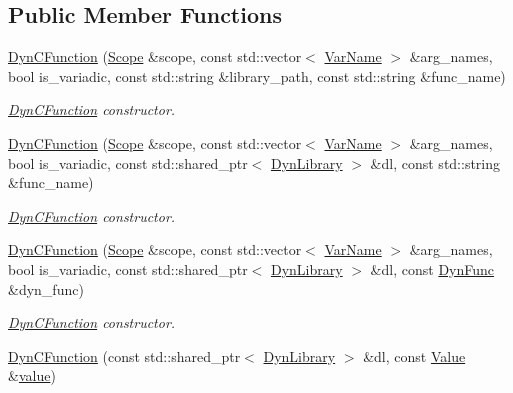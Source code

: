 \subsection*{Public Member Functions}
\begin{DoxyCompactItemize}
\item 
\hyperlink{classcreek_1_1_dyn_c_function_aaeac7125ecea826e83e2c2e2475e7efe}{Dyn\+C\+Function} (\hyperlink{classcreek_1_1_scope}{Scope} \&scope, const std\+::vector$<$ \hyperlink{classcreek_1_1_var_name}{Var\+Name} $>$ \&arg\+\_\+names, bool is\+\_\+variadic, const std\+::string \&library\+\_\+path, const std\+::string \&func\+\_\+name)
\begin{DoxyCompactList}\small\item\em {\ttfamily \hyperlink{classcreek_1_1_dyn_c_function}{Dyn\+C\+Function}} constructor. \end{DoxyCompactList}\item 
\hyperlink{classcreek_1_1_dyn_c_function_aeb45e8760de9ceb5124646fb7fab026a}{Dyn\+C\+Function} (\hyperlink{classcreek_1_1_scope}{Scope} \&scope, const std\+::vector$<$ \hyperlink{classcreek_1_1_var_name}{Var\+Name} $>$ \&arg\+\_\+names, bool is\+\_\+variadic, const std\+::shared\+\_\+ptr$<$ \hyperlink{classcreek_1_1_dyn_library}{Dyn\+Library} $>$ \&dl, const std\+::string \&func\+\_\+name)
\begin{DoxyCompactList}\small\item\em {\ttfamily \hyperlink{classcreek_1_1_dyn_c_function}{Dyn\+C\+Function}} constructor. \end{DoxyCompactList}\item 
\hyperlink{classcreek_1_1_dyn_c_function_a34582ebf2aeaa44446721f5aaee89cca}{Dyn\+C\+Function} (\hyperlink{classcreek_1_1_scope}{Scope} \&scope, const std\+::vector$<$ \hyperlink{classcreek_1_1_var_name}{Var\+Name} $>$ \&arg\+\_\+names, bool is\+\_\+variadic, const std\+::shared\+\_\+ptr$<$ \hyperlink{classcreek_1_1_dyn_library}{Dyn\+Library} $>$ \&dl, const \hyperlink{classcreek_1_1_dyn_func}{Dyn\+Func} \&dyn\+\_\+func)
\begin{DoxyCompactList}\small\item\em {\ttfamily \hyperlink{classcreek_1_1_dyn_c_function}{Dyn\+C\+Function}} constructor. \end{DoxyCompactList}\item 
\hyperlink{classcreek_1_1_dyn_c_function_a0dd969ad70deef3a8a9d5ae8aff03b90}{Dyn\+C\+Function} (const std\+::shared\+\_\+ptr$<$ \hyperlink{classcreek_1_1_dyn_library}{Dyn\+Library} $>$ \&dl, const \hyperlink{classcreek_1_1_c_function_a6876be117b9faafce547d61b2e831131}{Value} \&\hyperlink{classcreek_1_1_c_function_a66d28f16e72a3b0cbbbe8e1d13162a60}{value})

\end{DoxyCompactItemize}
